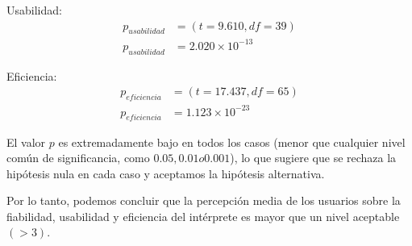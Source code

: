 Usabilidad:
\begin{equation*}
  \begin{split}
    p_{usabilidad} & = (t=9.610, df=39) \\
    p_{usabilidad} & = 2.020 \times 10^{-13}
  \end{split}
\end{equation*}

Eficiencia:
\begin{equation*}
  \begin{split}
    p_{eficiencia} & = (t=17.437, df=65) \\
    p_{eficiencia} & = 1.123 \times 10^{-23}
  \end{split}
\end{equation*}

El valor $p$ es extremadamente bajo en todos los casos (menor que cualquier nivel común de significancia, como $0.05, 0.01 o 0.001$), lo que sugiere que se rechaza la hipótesis nula en cada caso y aceptamos la hipótesis alternativa. 

Por lo tanto, podemos concluir que la percepción media de los usuarios sobre la fiabilidad, usabilidad y eficiencia del intérprete es mayor que un nivel aceptable $(>3)$.
